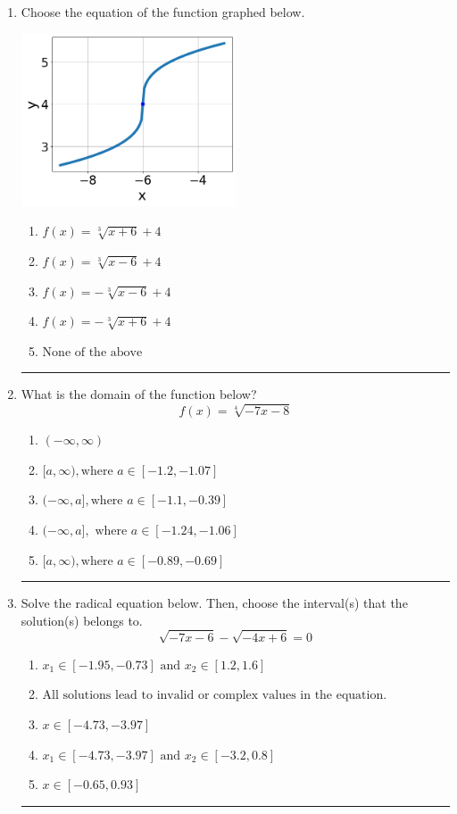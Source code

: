 \documentclass[14pt]{extbook}
\newcommand{\litem}[1]{\item#1\hspace*{-1cm}\rule{\textwidth}{0.4pt}}
\begin{document}
\begin{enumerate}
\litem{
Choose the equation of the function graphed below.
\begin{center}
    \includegraphics[width=0.5\textwidth]{../Figures/radicalGraphToEquationA.png}
\end{center}
\begin{enumerate}[label=\Alph*.]
\item \( f(x) = \sqrt[3]{x + 6} + 4 \)
\item \( f(x) = \sqrt[3]{x - 6} + 4 \)
\item \( f(x) = - \sqrt[3]{x - 6} + 4 \)
\item \( f(x) = - \sqrt[3]{x + 6} + 4 \)
\item \( \text{None of the above} \)

\end{enumerate} }
\litem{
What is the domain of the function below?\[ f(x) = \sqrt[4]{-7 x - 8} \]\begin{enumerate}[label=\Alph*.]
\item \( (-\infty, \infty) \)
\item \( [a, \infty), \text{where } a \in [-1.2, -1.07] \)
\item \( (-\infty, a], \text{where } a \in [-1.1, -0.39] \)
\item \( (-\infty, a], \text{ where } a \in [-1.24, -1.06] \)
\item \( [a, \infty), \text{where } a \in [-0.89, -0.69] \)

\end{enumerate} }
\litem{
Solve the radical equation below. Then, choose the interval(s) that the solution(s) belongs to.\[ \sqrt{-7 x - 6} - \sqrt{-4 x + 6} = 0 \]\begin{enumerate}[label=\Alph*.]
\item \( x_1 \in [-1.95, -0.73] \text{ and } x_2 \in [1.2,1.6] \)
\item \( \text{All solutions lead to invalid or complex values in the equation.} \)
\item \( x \in [-4.73,-3.97] \)
\item \( x_1 \in [-4.73, -3.97] \text{ and } x_2 \in [-3.2,0.8] \)
\item \( x \in [-0.65,0.93] \)


\end{enumerate}}
\end{enumerate}
\end{document}
